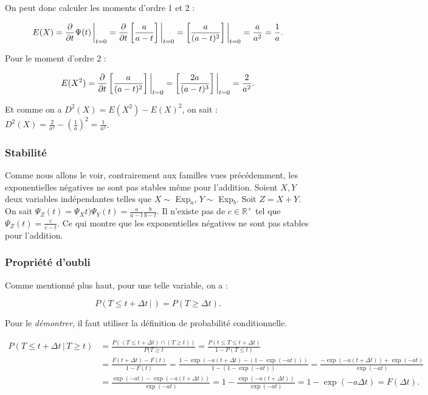 \documentclass{article}
\renewcommand{\pd}[1]{\frac {\partial}{\partial #1}}
\begin{document}
			On peut donc calculer les moments d'ordre 1 et 2 :

			\[E(X) = \pd t\Psi(t)\sVert[3]_{t=0} = \pd t\left[\frac a{a-t}\right]\sVert[3]_{t=0} = \left[\frac a{(a-t)^2}\right]\sVert[3]_{t=0} = \frac a{a^2} = \frac 1a.\]

			Pour le moment d'ordre 2 :

			\[E(X^2) = \pd t\left[\frac a{(a-t)^2}\right]\sVert[3]_{t=0} = \left[\frac {2a}{(a-t)^3}\right]\sVert[3]_{t=0} = \frac 2{a^2}.\]

			Et comme on a $D^2(X) = E(X^2) - E(X)^2$, on sait : $D^2(X) = \frac 2{a^2} - \left(\frac 1a\right)^2 = \frac 1{a^2}$.

		\subsubsection{Stabilité}
			Comme nous allons le voir, contrairement aux familles vues précédemment, les exponentielles négatives ne sont pas stables même pour l'addition. Soient $X, Y$ deux
			variables indépendantes telles que $X \sim $ Exp$_a$, $Y \sim $ Exp$_b$. Soit $Z = X + Y$. On sait $\Psi_Z(t) = \Psi_Xt)\Psi_Y(t) = \frac a{a-t}\frac b{b-t}$.
			Il n'existe pas de $c \in \mathbb R^+$ tel que $\Psi_Z(t) = \frac c{c-t}$. Ce qui montre que les exponentielles négatives ne sont pas stables pour l'addition.

		\subsubsection{Propriété d'oubli}
			Comme mentionné plus haut, pour une telle variable, on a :

			\[P(T \leq t + \Delta t \, | \, ) = P(T \geq \Delta t).\]

			Pour le \textit{démontrer}, il faut utiliser la définition de probabilité conditionnelle.

			\[\begin{aligned}
				P(T \leq t + \Delta t \, | \, T \geq t) &= \frac {P((T \leq t + \Delta t) \cap (T \geq t))}{P(T \geq t} = \frac {P(t \leq T \leq t+\Delta t)}{1-P(T \leq t)} \\
				&= \frac {F(t+\Delta t) - F(t)}{1-F(t)} = \frac {1-\exp(-a(t+\Delta t) - (1-\exp(-at)))}{1-(1-\exp(-at))} = \frac {-\exp(-a(t+\Delta t)) + \exp(-at)}{\exp(-at)} \\
				&= \frac {\exp(-at) - \exp(-a(t+\Delta t))}{\exp(-at)} = 1 - \frac {\exp(-a(t+\Delta t))}{\exp(-at)} = 1 - \exp(-a\Delta t) = F(\Delta t).
			\end{aligned}\]
\end{document}
